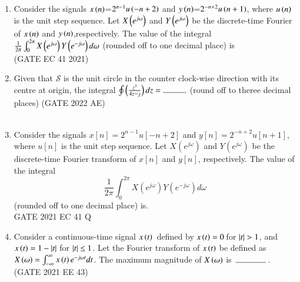 \begin{enumerate}[label=\thechapter.\arabic*,ref=\thechapter.\theenumi]
\item Consider the signals $x\left(n\right)$=$2^{n-1} u\left( -n+2\right)$ and $y\left(n\right)$=$2^{-n+2}u\left( n+1\right)$, where $u\left(n\right)$ is the unit step sequence. Let $X\left(e^{j\omega}\right)$ and $Y\left(e^{j\omega}\right)$ be the discrete-time Fourier of $x\left(n\right)$ and $y\left(n\right)$,respectively. The value of the integral $\frac{1}{2\pi}\int_{0}^{2\pi} X\left(e^{j\omega}\right) Y\left(e^{-j\omega}\right) d \omega$
(rounded off to one decimal place) is \underline{{\hspace{1.5in}}}\\
\hfill{(GATE EC 41 2021)}\\
\solution

\pagebreak
\item Given that $\mathcal{S}$ is the unit circle in the counter clock-wise direction with its centre at origin, the integral
        $\oint \brak{\frac{z^3}{4z-\jmath}}dz=\rule{1cm}{0.15mm}$
 (round off to theree decimal places)
 \hfill{(GATE 2022 AE)}\\
 \solution\\
 

\item Consider the signals \(x[n] = 2^{n-1} u[-n+2]\) and \(y[n] = 2^{-n+2} u[n+1]\), where \(u[n]\) is the unit step sequence. Let \(X(e^{j\omega})\) and \(Y(e^{j\omega})\) be the discrete-time Fourier transform of \(x[n]\) and \(y[n]\), respectively. The value of the integral
\[
\frac{1}{2\pi} \int_{0}^{2\pi} X(e^{j\omega}) Y(e^{-j\omega}) d\omega
\]
(rounded off to one decimal place) is.\\
\hfill{GATE 2021 EC 41 Q}
\solution

\pagebreak
\item Consider a continuous-time signal $x\left(t\right)$ \,defined by $x\left(t\right)=0$\,for $\left\vert t\right\vert>1$, and $x\left(t\right)=1-\left\vert t\right\vert$ for $\left\vert t\right\vert\le 1$. Let the Fourier transform of $x\left(t\right)$ be defined as $X\left(\omega\right)=\int_{-\infty}^{\infty}x\left(t\right)e^{-j\omega t} dt$. The maximum magnitude of $X\left(\omega\right)$ is $\hbox to 4em{\thinspace\hrulefill\thinspace}$.
\hfill{(GATE 2021 EE 43)}\\
\solution

\pagebreak
\end{enumerate}
